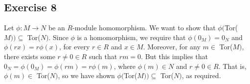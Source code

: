 \subsection*{Exercise 8}
Let $\phi: M \rightarrow N$ be an $R$-module homomorphism. We want to show that $\phi($Tor($M)) \subseteq$ Tor($N)$. Since $\phi$ is a homomorphism, we require that $\phi(0_M) = 0_N$ and $\phi(rx) = r\phi(x)$, for every $r \in R$ and $x \in M$. Moreover, for any $m \in$ Tor($M)$, there exists some $r \not= 0 \in R$ such that $rm = 0$. But this implies that $0_N = \phi(0_M) = \phi(rm) = r\phi(m)$, where $\phi(m) \in N$ and $r \not= 0 \in R$. That is, $\phi(m) \in$ Tor($N)$, so we have shown $\phi($Tor($M)) \subseteq$ Tor($N)$, as required.